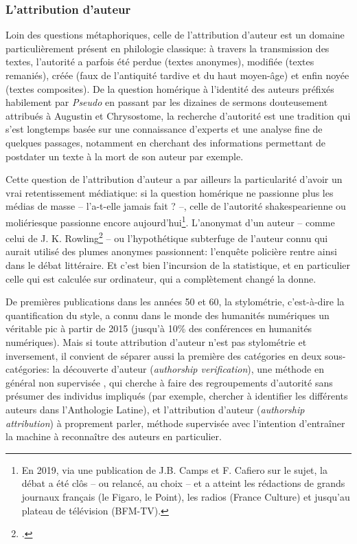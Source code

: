 \subsubsection{L'attribution d'auteur}

Loin des questions métaphoriques, celle de l'attribution d'auteur est un domaine particulièrement présent en philologie classique: à travers la transmission des textes, l'autorité a parfois été perdue (textes anonymes), modifiée (textes remaniés), créée (faux de l'antiquité tardive et du haut moyen-âge) et enfin noyée (textes composites). De la question homérique à l'identité des auteurs préfixés habilement par \textit{Pseudo} en passant par les dizaines de sermons douteusement attribués à Augustin et Chrysostome, la recherche d'autorité est une tradition qui s'est longtemps basée sur une connaissance d'experts et une analyse fine de quelques passages, notamment en cherchant des informations permettant de postdater un texte à la mort de son auteur par exemple. 

Cette question de l'attribution d'auteur a par ailleurs la particularité d'avoir un vrai retentissement médiatique: si la question homérique ne passionne plus les médias de masse -- l'a-t-elle jamais fait ? --, celle de l'autorité shakespearienne ou moliériesque passionne encore aujourd'hui\footnote{En 2019, via une publication de J.B. Camps et F. Cafiero sur le sujet, la débat a été clôs -- ou relancé, au choix -- et a atteint les rédactions de grands journaux français (le Figaro, le Point), les radios (France Culture) et jusqu'au plateau de télévision (BFM-TV).}. L'anonymat d'un auteur -- comme celui de J. K. Rowling\footcite{juola_how_2013} -- ou l'hypothétique subterfuge de l'auteur connu qui aurait utilisé des plumes anonymes passionnent: l'enquête policière rentre ainsi dans le débat littéraire. Et c'est bien l'incursion de la statistique, et en particulier celle qui est calculée sur ordinateur, qui a complètement changé la donne. 

De premières publications dans les années 50 et 60, la stylométrie, c'est-à-dire la quantification du style, a connu dans le monde des humanités numériques un véritable pic à partir de 2015 (jusqu'à 10\% des conférences en humanités numériques). Mais si toute attribution d'auteur n'est pas stylométrie et inversement, il convient de séparer aussi la première des catégories en deux sous-catégories: la découverte d'auteur (\textit{authorship verification}), une méthode en général non supervisée , qui cherche à faire des regroupements d'autorité sans présumer des individus impliqués (par exemple, chercher à identifier les différents auteurs dans l'Anthologie Latine), et l'attribution d'auteur (\textit{authorship attribution}) à proprement parler, méthode supervisée avec l'intention d'entraîner la machine à reconnaître des auteurs en particulier.

